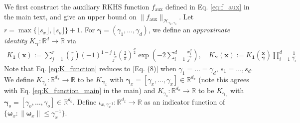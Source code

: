\documentclass[11pt]{article}
\newcommand{\bgamma}{\boldsymbol{\gamma}}
\newcommand{\bx}{\mathbf x}
\newcommand{\bomega}{\boldsymbol{\omega}}
\newcommand{\calH}{\mathcal{H}}
\newcommand{\R}{\mathbb{R}}
\newcommand{\0}{\mathbf{0}}
\begin{document}
\begin{appendix}
We first construct the auxiliary RKHS function $f_{\mathrm{aux}}$ defined in Eq. \eqref{eq:f_aux} in the main text, and give an upper bound on $\|f_{\mathrm{aux}}\|_{\calH_{\gamma_x,\gamma_o}}$. Let $r = \max\{ \lfloor s_x\rfloor, \lfloor s_o \rfloor\} + 1 $. For $\bgamma = (\gamma_1,\dots, \gamma_d)$, we define an \emph{approximate identity} \citep[Section 4.1.2]{Giné_Nickl_2015} $K_{\bgamma}: \R^{d}\to \R$ via
\begin{align}
\label{eq:K_function}
    K_{\mathbf{1}}(\bx) := \sum_{j=1}^r\binom{r}{j}(-1)^{1-j} \frac{1}{j^{d}}\left(\frac{2}{\pi}\right)^{\frac{d}{2}}  \exp\left( -2 \sum_{i=1}^{d} \frac{x_i^2}{j^2} \right) , \quad
    K_{\bgamma}(\bx) :=  K_{\mathbf{1}}\left(\frac{\bx}{\bgamma}\right)\prod_{i=1}^{d}\frac{1}{\gamma_i}
\end{align}
Note that Eq. \eqref{eq:K_function} reduces to \cite{eberts2013optimal}[Eq. (8)] when $\gamma_1 = \dots = \gamma_{d}$, $s_1 = \dots, s_{d}$. 
We define $K_{\gamma_x} : \R^{d_x}\to \R$ to be $K_{\bgamma_x}$ with $\bgamma_x = \left[\gamma_x, \ldots,\gamma_x\right]\in\R^{d_x}$ (note this agrees with Eq. \eqref{eq:K_function_main} in the main) and 
$K_{\gamma_o} : \R^{d_o}\to \R$ to be $K_{\bgamma_o}$ with $\bgamma_o = \left[\gamma_o, \ldots,\gamma_o\right]\in\R^{d_o}$. 
Define $\iota_{x, \gamma_x^{-1}}:\R^{d_x} \to \R$ as an indicator function of $\{\bomega_x: \|\bomega_x\| \leq \gamma_x^{-1}\}$. 


\end{appendix}
\end{document}
